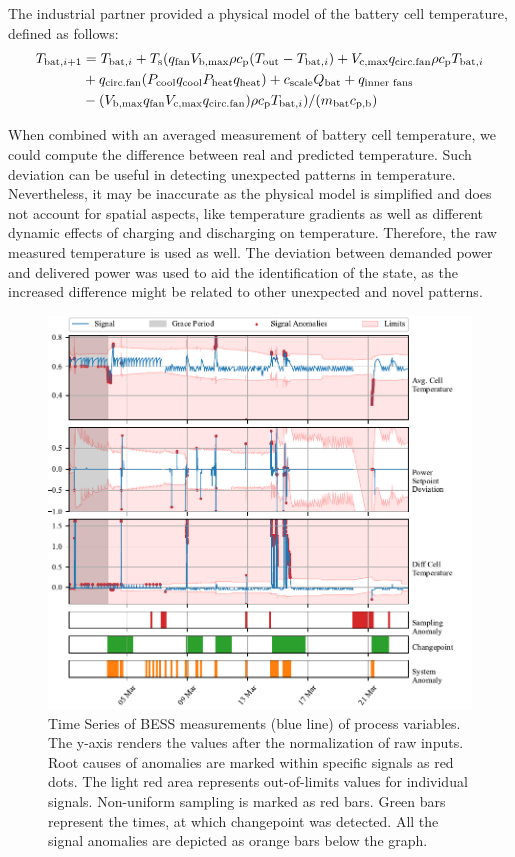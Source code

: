 The industrial partner provided a physical model of the battery cell temperature, defined as follows:
\begin{align}
 T _{\text{bat}, i+1} &= T _{\text{bat}, i} + T _{\text{s}} (q _{\text{fan}} V _{\text{b,max}} \rho c _{\text{p}} (T _{\text{out}} - T _{\text{bat}, i}) + V _{\text{c,max}}q _{\text{circ.fan}} \rho c _{\text{p}} T _{\text{bat}, i} \nonumber \\
 &+ q _{\text{circ.fan}} (P _{\text{cool}} q _{\text{cool}} P _{\text{heat}} q _{\text{heat}}) + c _{\text{scale}} Q _{\text{bat}} + q _{\text{inner fans}} \\
 &- (V _{\text{b,max}} q _{\text{fan}} V _{\text{c,max}} q _{\text{circ.fan}}) \rho c _{\text{p}} T _{\text{bat}, i}) / (m _{\text{bat}} c _{\text{p,b}}) \nonumber
\end{align}

When combined with an averaged measurement of battery cell temperature, we could compute the difference between real and predicted temperature. Such deviation can be useful in detecting unexpected patterns in temperature. Nevertheless, it may be inaccurate as the physical model is simplified and does not account for spatial aspects, like temperature gradients as well as different dynamic effects of charging and discharging on temperature. Therefore, the raw measured temperature is used as well.
The deviation between demanded power and delivered power was used to aid the identification of the state, as the increased difference might be related to other unexpected and novel patterns.

\begin{figure}[htbp]
\centerline{\includegraphics{figures/BESS_thresh.pdf}}
\caption{Time Series of BESS measurements (blue line) of process variables. The y-axis renders the values after the normalization of raw inputs. Root causes of anomalies are marked within specific signals as red dots. The light red area represents out-of-limits values for individual signals. Non-uniform sampling is marked as red bars. Green bars represent the times, at which changepoint was detected. All the signal anomalies are depicted as orange bars below the graph.}
\label{fig:bess}
\end{figure}

